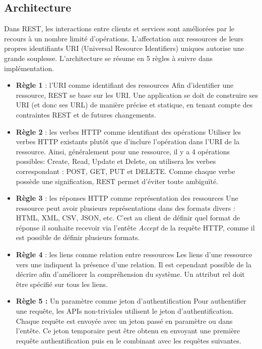 					\subsection{Architecture}
			Dans REST, les interactions entre clients et services sont améliorées par le recours à un nombre limité d'opérations. L'affectation aux ressources de leurs propres identifiants URI (Universal Resource Identifiers) uniques autorise une grande souplesse. L'architecture se résume en 5 règles à suivre dans implémentation.\cite{refRegles}
		\begin{itemize}
		\item \textbf{Règle 1} : l'URI comme identifiant des ressources\newline
Afin d'identifier une ressource, REST se base sur les URI. Une application se doit de construire ses URI (et donc ses URL) de manière précise et statique, en tenant compte des contraintes REST et de futures changements.
	\item \textbf{Règle 2} : les verbes HTTP comme identifiant des opérations\newline
Utiliser les verbes HTTP existants plutôt que d'inclure l'opération dans l'URI de la ressource. Ainsi, généralement pour une ressource, il y a 4 opérations possibles: Create, Read, Update et Delete, on utilisera les verbes correspondant : POST, GET, PUT et DELETE.
Comme chaque verbe possède une signification, REST permet d'éviter toute ambiguïté.
	\item \textbf{Règle 3} : les réponses HTTP comme représentation des ressources\newline
Une ressource peut avoir plusieurs représentations dans des formats divers : HTML, XML, CSV, JSON, etc. C'est au client de définir quel format de réponse il souhaite recevoir via l'entête \emph{Accept} de la requête HTTP, comme il est possible de définir plusieurs formats.
	\item \textbf{Règle 4} : les liens comme relation entre ressources\newline
Les liens d'une ressource vers une indiquent la présence d'une relation. Il est cependant possible de la décrire afin d'améliorer la compréhension du système. Un attribut rel doit être spécifié sur tous les liens.
	\item \textbf{Règle 5 :} Un paramètre comme jeton d'authentification\newline
Pour authentifier une requête, les APIs non-triviales utilisent le jeton d'authentification. Chaque requête est envoyée avec un jeton passé en paramètre ou dans l'entête. Ce jeton temporaire peut être obtenu en envoyant une première requête authentification puis en le combinant avec les requêtes suivantes.
		\end{itemize}
